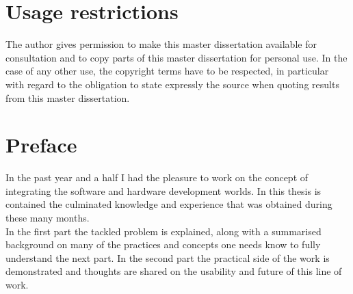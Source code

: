 \documentclass[11pt,british]{article}
\begin{document}

\newpage{}
\part*{Usage restrictions}

The author gives permission to make this master dissertation available for consultation 
and to copy parts of this master dissertation for personal use. 
 In the case of any other use, the copyright terms have to be respected, in particular with regard to 
the obligation to state expressly the source when quoting results from this master dissertation.

\pagebreak{}


\newpage{}\part*{Preface}
In the past year and a half I had the pleasure to work on the concept of integrating the software and hardware development worlds. In this thesis is contained the culminated knowledge and experience that was obtained during these many months.
\\[\baselineskip]
In the first part the tackled problem is explained, along with a summarised background on many of the practices and concepts one needs know to fully understand the next part. In the second part the practical side of the work is demonstrated and thoughts are shared on the usability and future of this line of work.
\\[\baselineskip]
\end{document}
